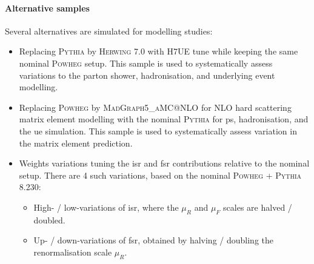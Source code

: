 \paragraph{Alternative samples} Several alternatives are simulated for modelling studies:
\begin{itemize}
  \item Replacing \textsc{Pythia} by \textsc{Herwing} 7.0 with H7UE tune \cite{herwig7R} while keeping the same nominal \textsc{Powheg} setup. This sample is used to systematically assess variations to the parton shower, hadronisation, and underlying event modelling.
  \item Replacing \textsc{Powheg} by \textsc{MadGraph5\_aMC@NLO} \cite{madgraph} for NLO hard scattering matrix element modelling with the nominal \textsc{Pythia} for \gls{ps}, hadronisation, and the \gls{ue} simulation. This sample is used to systematically assess variation in the matrix element prediction.
  \item Weights variations tuning the \gls{isr} and \gls{fsr} contributions relative to the nominal setup. There are 4 such variations, based on the nominal \textsc{Powheg} + \textsc{Pythia} 8.230:
  \begin{itemize}
    \item High- / low-variations of \gls{isr}, where the $\mu_R$ and $\mu_F$ scales are halved / doubled. %
    \item Up- / down-variations of \gls{fsr}, obtained by halving / doubling the renormalisation scale $\mu_{R}$. 
  \end{itemize}
\end{itemize} 

